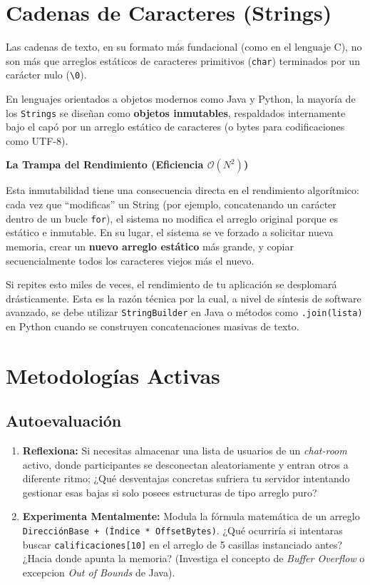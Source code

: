 \documentclass[
  spanish,
  letterpaper,
  DIV=11,
  numbers=noendperiod]{scrreprt}
\providecommand{\tightlist}{%
  \setlength{\itemsep}{0pt}\setlength{\parskip}{0pt}}
\begin{document}
\section{Cadenas de Caracteres (Strings)}\label{sec-strings}

Las cadenas de texto, en su formato más fundacional (como en el lenguaje
C), no son más que arreglos estáticos de caracteres primitivos
(\texttt{char}) terminados por un carácter nulo
(\texttt{\textbackslash{}0}).

En lenguajes orientados a objetos modernos como Java y Python, la
mayoría de los \texttt{Strings} se diseñan como \textbf{objetos
inmutables}, respaldados internamente bajo el capó por un arreglo
estático de caracteres (o bytes para codificaciones como UTF-8).

\textbf{La Trampa del Rendimiento (Eficiencia \(\mathcal{O}(N^2)\))}

Esta inmutabilidad tiene una consecuencia directa en el rendimiento
algorítmico: cada vez que ``modificas'' un String (por ejemplo,
concatenando un carácter dentro de un bucle \texttt{for}), el sistema no
modifica el arreglo original porque es estático e inmutable. En su
lugar, el sistema se ve forzado a solicitar nueva memoria, crear un
\textbf{nuevo arreglo estático} más grande, y copiar secuencialmente
todos los caracteres viejos más el nuevo.

Si repites esto miles de veces, el rendimiento de tu aplicación se
desplomará drásticamente. Esta es la razón técnica por la cual, a nivel
de síntesis de software avanzado, se debe utilizar
\texttt{StringBuilder} en Java o métodos como
\texttt{\textquotesingle{}\textquotesingle{}.join(lista)} en Python
cuando se construyen concatenaciones masivas de texto.

\section{Metodologías Activas}\label{metodologuxedas-activas}

\subsection{Autoevaluación}\label{autoevaluaciuxf3n}

\begin{enumerate}
\def\labelenumi{\arabic{enumi}.}
\tightlist
\item
  \textbf{Reflexiona:} Si necesitas almacenar una lista de usuarios de
  un \emph{chat-room} activo, donde participantes se desconectan
  aleatoriamente y entran otros a diferente ritmo; ¿Qué desventajas
  concretas sufriera tu servidor intentando gestionar esas bajas si solo
  posees estructuras de tipo arreglo puro?
\item
  \textbf{Experimenta Mentalmente:} Modula la fórmula matemática de un
  arreglo \texttt{DirecciónBase\ +\ (Índice\ *\ OffsetBytes)}. ¿Qué
  ocurriría si intentaras buscar \texttt{calificaciones{[}10{]}} en el
  arreglo de 5 casillas instanciado antes? ¿Hacia donde apunta la
  memoria? (Investiga el concepto de \emph{Buffer Overflow} o excepcion
  \emph{Out of Bounds} de Java).
\end{enumerate}
\end{document}
